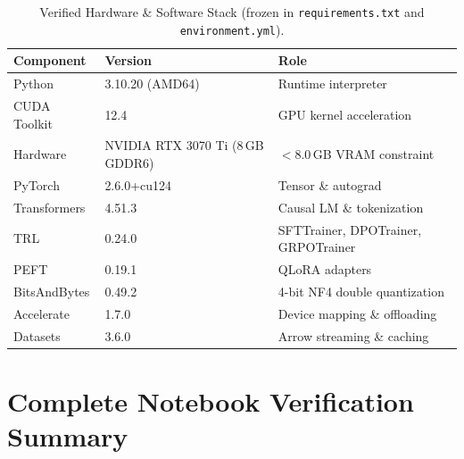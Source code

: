 \documentclass[12pt, a4paper]{article}
\begin{document}
\begin{table}[H]
\centering
\small
\caption{Verified Hardware \& Software Stack (frozen in \texttt{requirements.txt} and \texttt{environment.yml}).}
\label{tab:env_specs}
\begin{tabularx}{\textwidth}{l l X}
\toprule
\textbf{Component} & \textbf{Version} & \textbf{Role} \\
\midrule
Python             & 3.10.20 (AMD64)           & Runtime interpreter \\
CUDA Toolkit       & 12.4                      & GPU kernel acceleration \\
Hardware           & NVIDIA RTX 3070 Ti (8\,GB GDDR6) & $<8.0$\,GB VRAM constraint \\
PyTorch            & 2.6.0+cu124               & Tensor \& autograd \\
Transformers       & 4.51.3                    & Causal LM \& tokenization \\
TRL                & 0.24.0                    & SFTTrainer, DPOTrainer, GRPOTrainer \\
PEFT               & 0.19.1                    & QLoRA adapters \cite{peft_qlora} \\
BitsAndBytes       & 0.49.2                    & 4-bit NF4 double quantization \\
Accelerate         & 1.7.0                     & Device mapping \& offloading \\
Datasets           & 3.6.0                     & Arrow streaming \& caching \\
\bottomrule
\end{tabularx}
\end{table}

\section{Complete Notebook Verification Summary}
\end{document}
